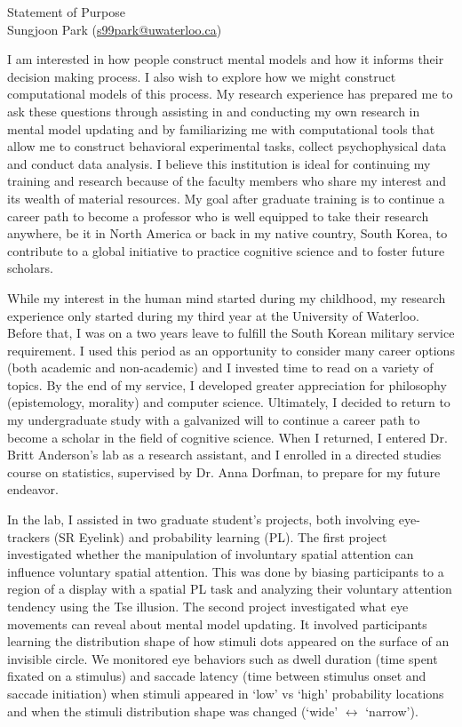 \documentclass[12pt]{article}
\let\oldcenter\center
\let\oldendcenter\endcenter
\renewenvironment{center}{\setlength\topsep{-1pt}\oldcenter}{\oldendcenter}
\begin{document}
	
	\begin{center}
		{\Large Statement of Purpose} \\
		{\normalsize Sungjoon Park (\href{mailto:s99park@uwaterloo.ca}{s99park@uwaterloo.ca})}
	\end{center}
	
	I am interested in how people construct mental models and how it informs their decision making process. I also wish to explore how we might construct computational models of this process. My research experience has prepared me to ask these questions through assisting in and conducting my own research in mental model updating and by familiarizing me with computational tools that allow me to construct behavioral experimental tasks, collect psychophysical data and conduct data analysis. I believe this institution is ideal for continuing my training and research because of the faculty members who share my interest and its wealth of material resources. My goal after graduate training is to continue a career path to become a professor who is well equipped to take their research anywhere, be it in North America or back in my native country, South Korea, to contribute to a global initiative to practice cognitive science and to foster future scholars.
	
	While my interest in the human mind started during my childhood, my research experience only started during my third year at the University of Waterloo. Before that, I was on a two years leave to fulfill the South Korean military service requirement. I used this period as an opportunity to consider many career options (both academic and non-academic) and I invested time to read on a variety of topics. By the end of my service, I developed greater appreciation for philosophy (epistemology, morality) and computer science. Ultimately, I decided to return to my undergraduate study with a galvanized will to continue a career path to become a scholar in the field of cognitive science. When I returned, I entered Dr. Britt Anderson’s lab as a research assistant, and I enrolled in a directed studies course on statistics, supervised by Dr. Anna Dorfman, to prepare for my future endeavor.
	
	In the lab, I assisted in two graduate student's projects, both involving eye-trackers (SR Eyelink) and probability learning (PL). The first project investigated whether the manipulation of involuntary spatial attention can influence voluntary spatial attention. This was done by biasing participants to a region of a display with a spatial PL task and analyzing their voluntary attention tendency using the Tse illusion. The second project investigated what eye movements can reveal about mental model updating. It involved participants learning the distribution shape of how stimuli dots appeared on the surface of an invisible circle. We monitored eye behaviors such as dwell duration (time spent fixated on a stimulus) and saccade latency (time between stimulus onset and saccade initiation) when stimuli appeared in `low' vs `high' probability locations and when the stimuli distribution shape was changed (`wide' $\leftrightarrow$ `narrow').
	
\end{document}
